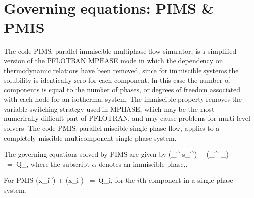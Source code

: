 \documentclass[12pt]{article}
\def\EQ#1\EN{\begin{equation}#1\end{equation}}
\newcommand{\eq}{\ =\ }
\newcommand{\p}{{\partial}}
\renewcommand{\a}{{\alpha}}
\newcommand{\bnabla}{\boldsymbol{\nabla}}
\newcommand{\bq}{\boldsymbol{q}}
\begin{document}
\normalsize

\tableofcontents



\clearpage



\section{Governing equations: PIMS \& PMIS}

The code PIMS, parallel immiscible multiphase flow simulator, is a simplified version of the PFLOTRAN MPHASE mode in which the dependency on thermodynamic relations have been removed, since for immiscible systems the solubility is identically zero for each component. In this case the number of components is equal to the number of phases, or degrees of freedom associated with each node for an isothermal system. The immiscible property removes the variable switching strategy used in MPHASE, which may be the most numerically difficult part of PFLOTRAN, and may cause problems for multi-level solvers. The code PMIS, parallel miscible single phase flow, applies to a completely miscible multicomponent single phase system.

The governing equations solved by PIMS are given by
\EQ\label{mass}
\frac{\p}{\p t}\big(\varphi\rho_\a^{} s_\a^{}\big) + \bnabla\cdot \big(\rho_\a^{} \bq_\a \big) \eq Q_\a,
\EN
where the subscript $\a$ denotes an immiscible phase,. 

For PMIS
\EQ\label{massmis}
\frac{\p}{\p t}\big(\varphi\rho x_i^{}\big) + \bnabla\cdot \big(\rho \bq x_i \big) \eq Q_i,
\EN
for the $i$th component in a single phase system.
\end{document}
